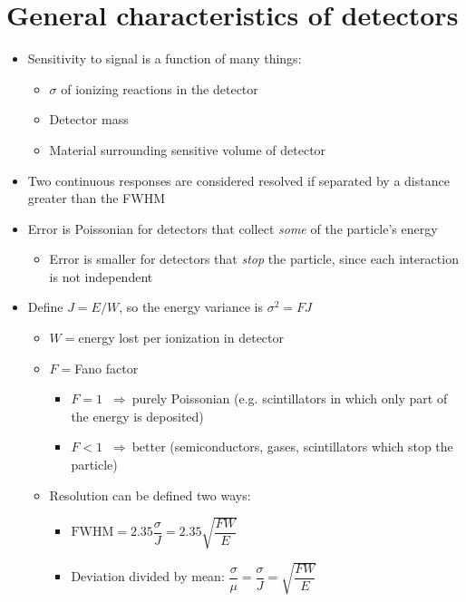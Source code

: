 \documentclass[11pt]{article}
\newcommand{\thus}{$~\Rightarrow~$}
\begin{document}
\section{General characteristics of detectors}
\begin{itemize}
  \item Sensitivity to signal is a function of many things:
  \begin{itemize}
    \item $\sigma$ of ionizing reactions in the detector
    \item Detector mass
    \item Material surrounding sensitive volume of detector
  \end{itemize}
  \item Two continuous responses are considered resolved if separated by a distance greater than the FWHM
  \item Error is Poissonian for detectors that collect \emph{some} of the particle's energy
  \begin{itemize}
    \item Error is smaller for detectors that \emph{stop} the particle, since each interaction is not independent
  \end{itemize}
  \item Define $J=E/W$, so the energy variance is $\sigma^2=FJ$
  \begin{itemize}
    \item $W=$energy lost per ionization in detector
    \item $F=$Fano factor
    \begin{itemize}
      \item $F=1$ \thus purely Poissonian (e.g. scintillators in which only part of the energy is deposited)
      \item $F<1$ \thus better (semiconductors, gases, scintillators which stop the particle)
    \end{itemize}
    \item Resolution can be defined two ways:
    \begin{itemize}
      \item $\text{FWHM} = 2.35 \dfrac{\sigma}{J} = 2.35\sqrt{\dfrac{FW}{E}}$
      \item Deviation divided by mean: $\dfrac{\sigma}{\mu} = \dfrac{\sigma}{J} = \sqrt{\dfrac{FW}{E}}$
    \end{itemize}
  \end{itemize}
\end{itemize}
\end{document}
